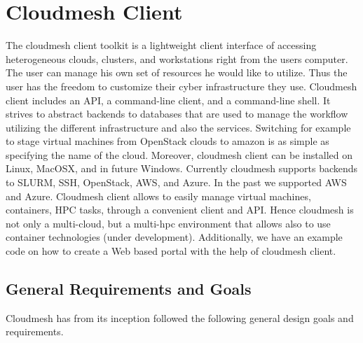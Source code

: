 \section{Cloudmesh Client}
\label{S:cmclient}

The cloudmesh client toolkit is a lightweight client interface of
accessing heterogeneous clouds, clusters, and workstations right from
the users computer. The user can manage his own set of resources he
would like to utilize. Thus the user has the freedom to customize
their cyber infrastructure they use. Cloudmesh client includes an API,
a command-line client, and a command-line shell. It strives to abstract
backends to databases that are used to manage the workflow utilizing
the different infrastructure and also the services. Switching for
example to stage virtual machines from OpenStack clouds to amazon is
as simple as specifying the name of the cloud. Moreover, cloudmesh
client can be installed on Linux, MacOSX, and in future
Windows. Currently cloudmesh supports backends to SLURM, SSH,
OpenStack, AWS, and Azure. In the past we supported AWS and Azure.
Cloudmesh client allows to easily manage virtual machines, containers,
HPC tasks, through a convenient client and API. Hence cloudmesh is not
only a multi-cloud, but a multi-hpc environment that allows also to
use container technologies (under development). Additionally, we have
an example code on how to create a Web based portal with the help of
cloudmesh client.

\subsection{General Requirements and Goals}

Cloudmesh has from its inception followed the following general design
goals and requirements.

